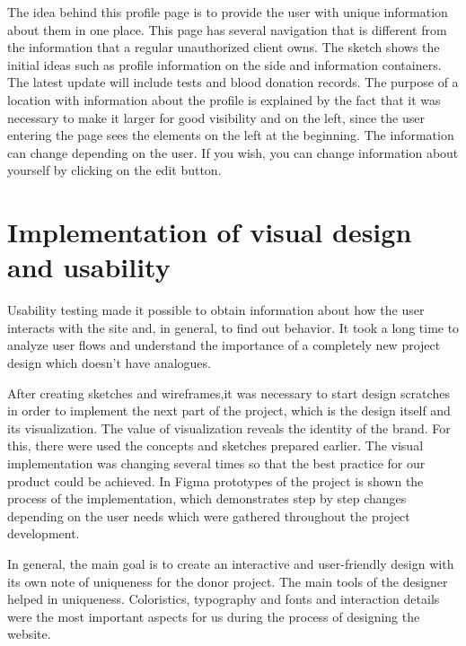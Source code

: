 \par
The idea behind this profile page is to provide the user with unique information about them in one place. This page has several navigation that is different from the information that a regular unauthorized client owns. The sketch shows the initial ideas such as profile information on the side and information containers. The latest update will include tests and blood donation records. The purpose of a location with information about the profile is explained by the fact that it was necessary to make it larger for good visibility and on the left, since the user entering the page sees the elements on the left at the beginning. The information can change depending on the user. If you wish, you can change information about yourself by clicking on the edit button.

\section{Implementation of visual design and usability}
Usability testing made it possible to obtain information about how the user interacts with the site and, in general, to find out behavior. It took a long time to analyze user flows and  understand the importance of a completely new project design which doesn't have analogues. 
\par
After creating sketches and wireframes,it was necessary to start design scratches in order to implement the next part of the project, which is the design itself and its visualization. The value of visualization reveals the identity of the brand. For this, there were used the concepts and sketches prepared earlier. The visual implementation was changing several times so that the best practice for our product could be achieved. In Figma prototypes of the project is shown the process of the implementation, which demonstrates step by step changes depending on the user needs which were gathered throughout the project development.
\par
In general, the main goal is to create an interactive and user-friendly design with its own note of uniqueness for the donor project. The main tools of the designer helped in uniqueness. Coloristics, typography and fonts and interaction details were the most important aspects for us during the process of designing the website.

